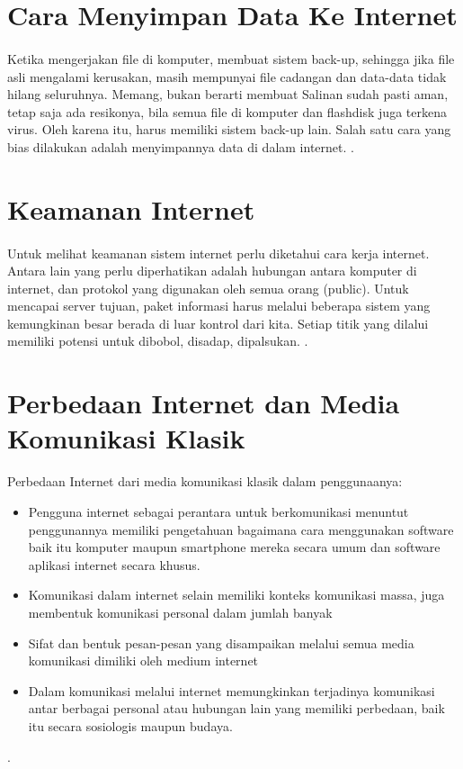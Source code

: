 \section{Cara Menyimpan Data Ke Internet}
\paragraph{} Ketika mengerjakan file di komputer, membuat sistem back-up, sehingga jika file asli mengalami kerusakan, masih mempunyai file cadangan dan data-data tidak hilang seluruhnya. Memang, bukan berarti membuat Salinan sudah pasti aman, tetap saja ada resikonya, bila semua file di komputer dan flashdisk juga terkena virus. Oleh karena itu, harus memiliki sistem back-up lain. Salah satu cara yang bias dilakukan adalah menyimpannya data di dalam internet.
\cite{lim2014informational}.

\section{Keamanan Internet}
\paragraph{} Untuk melihat keamanan sistem internet perlu diketahui cara kerja internet. Antara lain yang perlu diperhatikan adalah hubungan antara komputer di internet, dan protokol yang digunakan oleh semua orang (public). Untuk mencapai server tujuan, paket informasi harus melalui beberapa sistem yang kemungkinan besar berada di luar kontrol dari kita. Setiap titik yang dilalui memiliki potensi untuk dibobol, disadap, dipalsukan.
\cite{rahardjo2002keamanan}.

\section{Perbedaan Internet dan Media Komunikasi Klasik}
Perbedaan Internet dari media komunikasi klasik dalam penggunaanya:
\begin{itemize}
\item Pengguna internet sebagai perantara untuk berkomunikasi menuntut penggunannya memiliki pengetahuan bagaimana cara menggunakan software baik itu komputer maupun smartphone mereka secara umum dan software aplikasi internet secara khusus.
\item Komunikasi dalam internet selain memiliki konteks komunikasi massa, juga membentuk komunikasi personal dalam jumlah banyak
\item Sifat dan bentuk pesan-pesan yang disampaikan melalui semua media komunikasi dimiliki oleh medium internet
\item Dalam komunikasi melalui internet memungkinkan terjadinya komunikasi antar berbagai personal atau hubungan lain yang memiliki perbedaan, baik itu secara sosiologis maupun budaya.
\end{itemize}
\cite{effendi2009peranan}.

